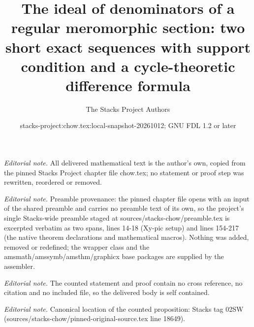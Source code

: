 \documentclass[10pt,a4paper]{amsart}
\title{The ideal of denominators of a regular meromorphic section: two short exact sequences with support condition and a cycle-theoretic difference formula}
\author{The Stacks Project Authors}
\date{stacks-project:chow.tex:local-snapshot-20261012; GNU FDL 1.2 or later}
\theoremstyle{plain}
\theoremstyle{definition}
\theoremstyle{remark}
\numberwithin{equation}{subsection}
\begin{document}
\maketitle
\noindent\textit{Editorial note.} All delivered mathematical text is the author's own, copied from the pinned Stacks Project chapter file chow.tex; no statement or proof step was rewritten, reordered or removed.\par\medskip
\noindent\textit{Editorial note.} Preamble provenance: the pinned chapter file opens with an input of the shared preamble and carries no preamble text of its own, so the project's single Stacks-wide preamble staged at sources/stacks-chow/preamble.tex is excerpted verbatim as two spans, lines 14-18 (Xy-pic setup) and lines 154-217 (the native theorem declarations and mathematical macros). Nothing was added, removed or redefined; the wrapper class and the amsmath/amssymb/amsthm/graphicx base packages are supplied by the assembler.\par\medskip
\noindent\textit{Editorial note.} The counted statement and proof contain no cross reference, no citation and no included file, so the delivered body is self contained.\par\medskip
\noindent\textit{Editorial note.} Canonical location of the counted proposition: Stacks tag 02SW (sources/stacks-chow/pinned-original-source.tex line 18649).\par\medskip
\end{document}
